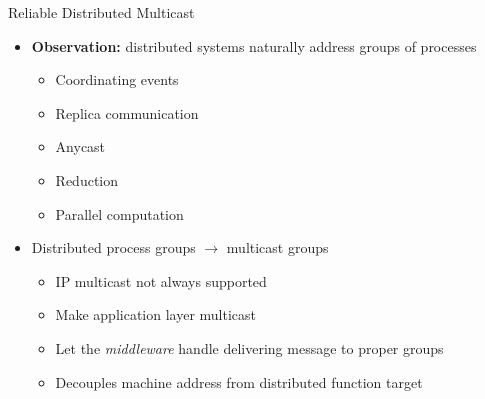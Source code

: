 \documentclass[pdftex]{beamer}
\begin{document}
\begin{frame}{Reliable Distributed Multicast}
\begin{itemize}
	\item \textbf{Observation:} distributed systems naturally address groups of processes
	\begin{itemize}
		\item Coordinating events
		\item Replica communication
		\item Anycast
		\item Reduction
		\item Parallel computation
	\end{itemize}
	
	\item Distributed process groups $\rightarrow$ multicast groups
	\begin{itemize}
		\item IP multicast not always supported
		\item Make application layer multicast
		\item Let the \emph{middleware} handle delivering message to proper groups
		\item Decouples machine address from distributed function target
	\end{itemize}
\end{itemize}
\end{frame}

\end{document}

